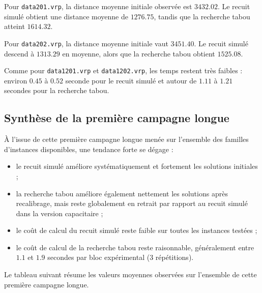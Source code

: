 \documentclass[11pt,a4paper]{article}
\begin{document}
Pour \texttt{data201.vrp}, la distance moyenne initiale observée est \(3432.02\). Le recuit simulé obtient une distance moyenne de \(1276.75\), tandis que la recherche tabou atteint \(1614.32\).

Pour \texttt{data202.vrp}, la distance moyenne initiale vaut \(3451.40\). Le recuit simulé descend à \(1313.29\) en moyenne, alors que la recherche tabou obtient \(1525.08\).

Comme pour \texttt{data1201.vrp} et \texttt{data1202.vrp}, les temps restent très faibles : environ \(0.45\) à \(0.52\) seconde pour le recuit simulé et autour de \(1.11\) à \(1.21\) secondes pour la recherche tabou.

\subsection{Synthèse de la première campagne longue}
À l'issue de cette première campagne longue menée sur l'ensemble des familles d'instances disponibles, une tendance forte se dégage :
\begin{itemize}
    \item le recuit simulé améliore systématiquement et fortement les solutions initiales ;
    \item la recherche tabou améliore également nettement les solutions après recalibrage, mais reste globalement en retrait par rapport au recuit simulé dans la version capacitaire ;
    \item le coût de calcul du recuit simulé reste faible sur toutes les instances testées ;
    \item le coût de calcul de la recherche tabou reste raisonnable, généralement entre \(1.1\) et \(1.9\) secondes par bloc expérimental (3 répétitions).
\end{itemize}

Le tableau suivant résume les valeurs moyennes observées sur l'ensemble de cette première campagne longue.
\end{document}
